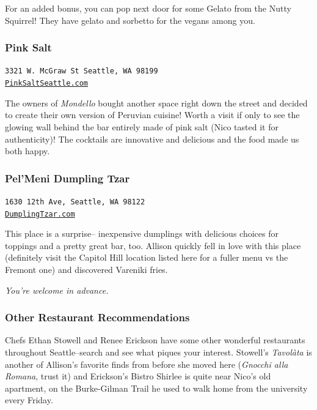 \documentclass[10pt]{article}
\begin{document}
For an added bonus, you can pop next door for some Gelato from the Nutty Squirrel! They 
have gelato and sorbetto for the vegans among you.

\newpage
\subsubsection{Pink Salt}
\begin{center}
    \texttt{3321 W. McGraw St Seattle, WA 98199\\\href{https://pinksaltseattle.com/}{PinkSaltSeattle.com}}
\end{center}
The owners of \textit{Mondello} bought another space right down the street and decided to create 
their own version of Peruvian cuisine! Worth a visit if only to see the glowing wall behind the bar
entirely made of pink salt (Nico tasted it for authenticity)! The cocktails are innovative and delicious 
and the food made us both happy.

\subsubsection{Pel'Meni Dumpling Tzar}
\begin{center}
    \texttt{1630 12th Ave, Seattle, WA 98122\\\href{http://dumplingtzar.com/}{DumplingTzar.com}}
\end{center}
This place is a surprise-- inexpensive dumplings with delicious choices for toppings and a pretty 
great bar, too. Allison quickly fell in love with this place (definitely visit the Capitol Hill location 
listed here for a fuller menu vs the Fremont one) and discovered Vareniki fries. 
\begin{center}
    \textit{You're welcome in advance.}    
\end{center}

\subsubsection{Other Restaurant Recommendations}
Chefs Ethan Stowell and Renee Erickson have some other wonderful restaurants throughout Seattle--search and 
see what piques your interest. Stowell's \textit{Tavol\`ata} is another of Allison's favorite finds from before she moved 
here (\textit{Gnocchi alla Romana}, trust it) and Erickson's Bistro Shirlee is quite near Nico's old apartment, on the 
Burke-Gilman Trail he used to walk home from the university every Friday. 
\end{document}
